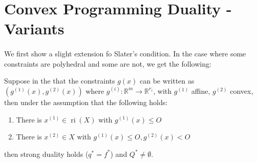 \section{Convex Programming Duality - Variants}
\label{sect:044}

\paragraph{}We first show a slight extension fo Slater's condition. In the case where some constraints are polyhedral and some are not, we get the following:

\begin{coro}\label{coro:044-slater-combined}
	Suppose in the  that the constraints $g(x)$ can be written as $(g^{(1)}(x),g^{(2)}(x))$ where $g^{(i)}:\mathbb{R}^m\to \mathbb{R}^{r_i}$, with $g^{(1)}$ affine, $g^{(2)}$ convex, then under the assumption that the following holds:
	\begin{enumerate}[label=(\alph*)]
		\item There is $x^{(1)}\in \operatorname{ri}(X)$ with $g^{(1)}(x)\leq O$
		\item There is $x^{(2)}\in X$ with $g^{(1)}(x)\leq O,g^{(2)}(x)<O$
	\end{enumerate}
	then strong duality holds ($q^\ast=f^\ast$) and $Q^\ast\neq\emptyset$.
\end{coro}

